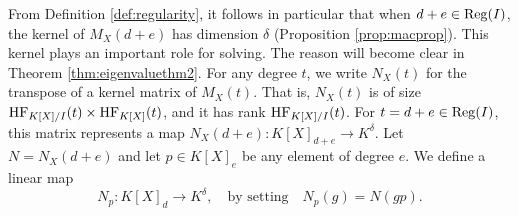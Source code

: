 \documentclass[12pt]{article}
\theoremstyle{definition}
\theoremstyle{remark}
\begin{document}
From Definition \ref{def:regularity}, it follows in particular that when $d+e \in {\rm Reg}(I)$, the kernel of $M_X(d+e)$ has dimension $\delta$ (Proposition \ref{prop:macprop}). This kernel plays an important role for solving. The reason will become clear in Theorem \ref{thm:eigenvaluethm2}. For any degree $t$, we write $N_X(t)$ for the transpose of a kernel matrix of $M_X(t)$. That is, $N_X(t)$ is of size ${\rm HF}_{K[X]/I}(t) \times {\rm HF}_{K[X]}(t)$, and it has rank ${\rm HF}_{K[X]/I}(t)$. For $t = d+e \in {\rm Reg}(I)$, this matrix represents a map $N_X(d+e): K[X]_{d+e} \longrightarrow K^\delta$. Let $N = N_X(d+e)$ and let $p \in K[X]_{e}$ be any element of degree $e$. We define a linear map 
\begin{equation} \label{eq:Nh} N_p : K[X]_{d} \longrightarrow K^{\delta}, \quad \text{by setting} \quad N_p(g) = N(gp). \end{equation}
\end{document}
